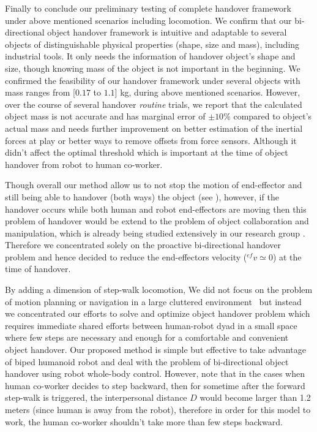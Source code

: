  
Finally to conclude our preliminary testing of complete handover framework under above mentioned scenarios including locomotion. We confirm that our bi-directional object handover framework is intuitive and adaptable to several objects of distinguishable physical properties (shape, size and mass), including  industrial tools. It only needs the information of handover object's shape and size, though knowing mass of the object is not important in the beginning. We confirmed the feasibility of our handover framework under several objects with mass ranges from [$0.17$ to $1.1$] kg, during above mentioned scenarios. However, over the course of several handover \textit{routine} trials, we report that the calculated object mass is not accurate and has marginal error of $ \pm10 $\% compared to object's actual mass and needs further improvement on better estimation of the inertial forces at play or  better ways to remove offsets from force sensors. Although it didn't affect the optimal threshold which is important at the time of object handover from robot to human co-worker.

Though overall our method allow us to not stop the motion of end-effector and still being able to handover (both ways) the object (see ), however, if the handover occurs while both human and robot end-effectors are moving then this problem of handover would be extend to the problem of object collaboration and manipulation, which is already being studied extensively in our research group \cite{bussy2012proactive, agravante2016walking, agravante2013human, bussy2012human, agravante2014collaborative, Agravante2019}. Therefore we concentrated solely on the proactive bi-directional handover problem and hence decided to reduce the end-effectors velocity (${}^{ef}v\simeq0$) at the time of handover. 

By adding a dimension of step-walk locomotion, We did not focus on the problem of motion planning or navigation in a large cluttered environment~\cite{mainprice2012sharing, vahrenkamp2009humanoid, kim2004advanced} but instead we concentrated our efforts to solve and optimize object handover problem which requires immediate shared efforts between human-robot dyad in a small space where few steps are necessary and enough for a comfortable and convenient object handover. Our proposed method is simple but effective to take advantage of biped humanoid robot and deal with the problem of bi-directional object handover using robot whole-body control. However, note that in the cases when human co-worker decides to step backward, then for sometime after the forward step-walk is triggered, the interpersonal distance $ D $ would become larger than 1.2 meters (since human is away from the robot), therefore in order for this model to work, the human co-worker shouldn't take more than few steps backward. 

